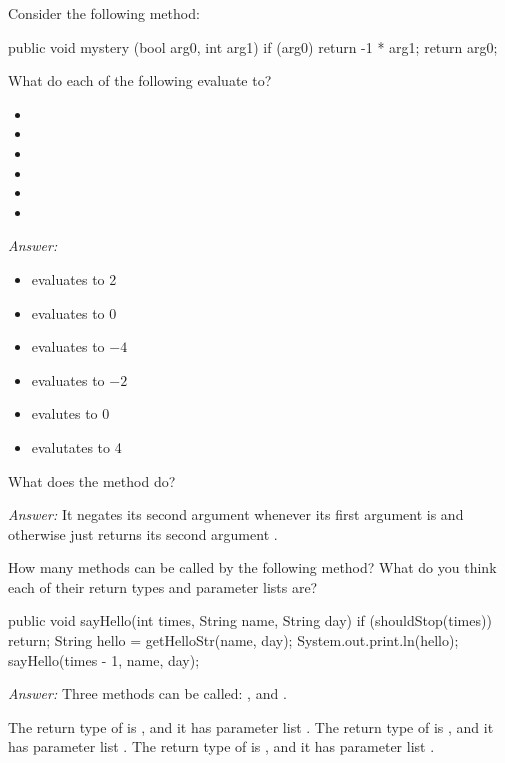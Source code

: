 \begin{example}
Consider the following method:
\begin{code}
public void mystery (bool arg0, int arg1) {
  if (arg0) {
    return -1 * arg1;
  }
  return arg0;
}
\end{code}

\noindent What do each of the following evaluate to?
\begin{itemize}
\item {}
\item {}
\item {}
\item {}
\item {}
\item {}
\end{itemize}

\noindent \emph{Answer:}
\begin{itemize}
\item {} evaluates to 2
\item {} evaluates to 0
\item {} evaluates to $-4$
\item {} evaluates to $-2$
\item {} evalutes to 0
\item {} evalutates to 4
\end{itemize}

\noindent What does the method do?

\noindent \emph{Answer:} It negates its second argument
 whenever its first argument  is
 and otherwise just returns its second argument
.
\end{example}

\begin{example}
How many methods can be called by the following method?
What do you think each of their return types and parameter lists are?

\begin{code}
public void sayHello(int times, String name, String day) {
  if (shouldStop(times))
    return;
  String hello = getHelloStr(name, day);
  System.out.print.ln(hello);
  sayHello(times - 1, name, day);
}
\end{code}
\noindent \emph{Answer:}
Three methods can be called: ,  and .

The return type of  is , and it has parameter list .
The return type of  is , and it has parameter list .
The return type of  is , and it has parameter list .
\end{example}

